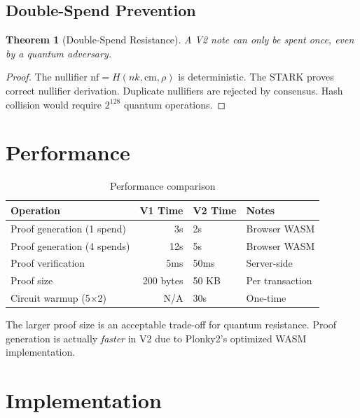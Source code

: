 \documentclass[11pt,a4paper]{article}
\newtheorem{theorem}{Theorem}
\begin{document}
\subsection{Double-Spend Prevention}

\begin{theorem}[Double-Spend Resistance]
A V2 note can only be spent once, even by a quantum adversary.
\end{theorem}

\begin{proof}
The nullifier $\text{nf} = H(nk, \text{cm}, \rho)$ is deterministic. The STARK proves correct nullifier derivation. Duplicate nullifiers are rejected by consensus. Hash collision would require $2^{128}$ quantum operations.
\end{proof}

\section{Performance}

\begin{table}[h]
\centering
\begin{tabular}{lrll}
\toprule
Operation & V1 Time & V2 Time & Notes \\
\midrule
Proof generation (1 spend) & 3s & 2s & Browser WASM \\
Proof generation (4 spends) & 12s & 5s & Browser WASM \\
Proof verification & 5ms & 50ms & Server-side \\
Proof size & 200 bytes & 50 KB & Per transaction \\
Circuit warmup (5$\times$2) & N/A & 30s & One-time \\
\bottomrule
\end{tabular}
\caption{Performance comparison}
\end{table}

The larger proof size is an acceptable trade-off for quantum resistance. Proof generation is actually \textit{faster} in V2 due to Plonky2's optimized WASM implementation.

\section{Implementation}
\end{document}
